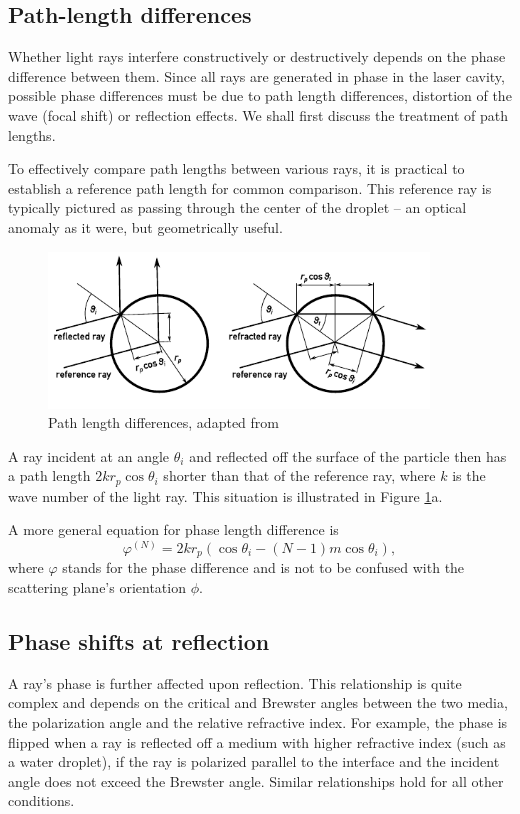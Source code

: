 \documentclass[11.5pt]{book}
\begin{document}
\subsection{Path-length differences}
Whether light rays interfere constructively or destructively depends on the
phase difference between them. Since all rays are generated in phase in the
laser cavity, possible phase differences must be due to path length differences,
distortion of the wave (focal shift) or reflection effects. We shall first
discuss the treatment of path lengths.

To effectively compare path lengths between various rays, it is practical to
establish a reference path length for common comparison. This reference ray is
typically pictured as passing through the center of the droplet -- an optical
anomaly as it were, but geometrically useful.

\begin{figure}
\centering
\includegraphics[width=0.9\textwidth]{img/scattering/pathlength.pdf}
\caption{Path length differences, adapted from \citet{Albrecht03}}
\label{fig:pathlength}
\end{figure}

A ray incident at an angle $\theta_i$ and reflected off the surface of the
particle then has a path length $2kr_p \cos \theta_i$ shorter than that of the
reference ray, where $k$ is the wave number of the light ray. This situation is
illustrated in Figure \ref{fig:pathlength}a.

A more general equation for phase length difference is
\begin{equation}
    \varphi^{(N)} = 2kr_p(\cos \theta_i - (N-1)m \cos \theta_i),
\end{equation}
where $\varphi$ stands for the phase difference and is not to be confused with
the scattering plane's orientation $\phi$.

\subsection{Phase shifts at reflection}
A ray's phase is further affected upon reflection. This relationship is quite
complex and depends on the critical and Brewster angles between the two media,
the polarization angle and the relative refractive index. For example, the phase
is flipped when a ray is reflected off a medium with higher refractive index
(such as a water droplet), if the ray is polarized parallel to the interface and
the incident angle does not exceed the Brewster angle. Similar relationships
hold for all other conditions.
\end{document}

